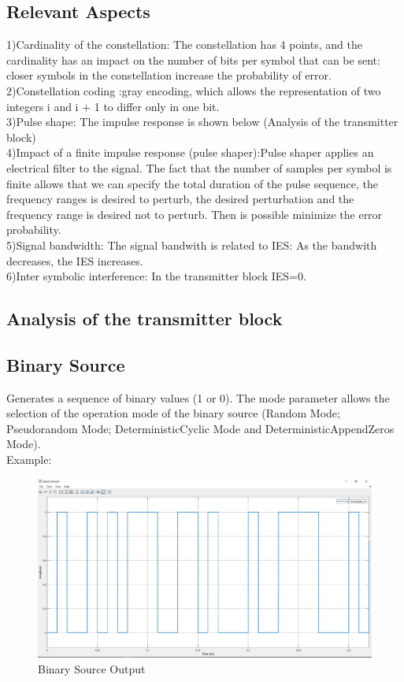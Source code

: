 \subsection*{Relevant Aspects}
1)Cardinality of the constellation: The constellation has 4 points, and the cardinality has an impact on the number of bits per symbol that can be sent: closer symbols in the constellation increase the probability of error.\\
2)Constellation coding :gray encoding, which allows the representation of two integers i and i + 1 to differ only in one bit.\\ 
3)Pulse shape: The impulse response is shown below (Analysis of the transmitter block)\\ 
4)Impact of a finite impulse response (pulse shaper):Pulse shaper applies an electrical filter to the signal. The fact that the number of samples per symbol is finite allows that we can specify the total duration of the pulse sequence, the frequency ranges is desired to perturb, the desired perturbation and the frequency range is desired not to perturb. Then is possible minimize the error probability.\\
5)Signal bandwidth: The signal bandwith is related to IES: As the bandwith decreases, the IES increases.\\
6)Inter symbolic interference: In the transmitter block IES=0.

\subsection*{Analysis of the transmitter block}
\subsection*{Binary Source}
Generates a sequence of binary values (1 or 0). The mode parameter allows the selection of the operation mode of the binary source (Random Mode; Pseudorandom Mode; DeterministicCyclic Mode and DeterministicAppendZeros Mode).\\
Example:
\begin{figure}[h]
	\centering
	\includegraphics[width=1\textwidth]{../lib/m_qam_transmitter/figures/S0.pdf}
	\caption{Binary Source Output}\label{fig:Binary Source Output}
\end{figure}

